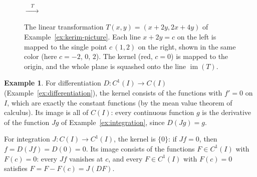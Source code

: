 \documentclass[11pt]{article}
\theoremstyle{definition}
\newtheorem{example}[definition]{Example}
\theoremstyle{plain}
\theoremstyle{remark}
\DeclareMathOperator{\im}{im}
\begin{document}
\begin{figure}[ht]
    \centering
    \quad $\xrightarrow{\quad T \quad}$ \quad
    \caption[Kernel and image of a linear transformation]{The linear transformation $T(x, y) = (x + 2y, 2x + 4y)$ of Example~\ref{ex:kerim-picture}. Each line $x + 2y = c$ on the left is mapped to the single point $c\,(1, 2)$ on the right, shown in the same color (here $c = -2$, $0$, $2$). The kernel (red, $c = 0$) is mapped to the origin, and the whole plane is squashed onto the line $\im(T)$.}
    \label{fig:kernel-image}
\end{figure}

\begin{example}\label{ex:D-kernel}
    For differentiation $D: C^1(I) \to C(I)$ (Example~\ref{ex:differentiation}), the kernel consists of the functions with $f' = 0$ on $I$, which are exactly the constant functions (by the mean value theorem of calculus). Its image is all of $C(I)$: every continuous function $g$ is the derivative of the function $Jg$ of Example~\ref{ex:integration}, since $D(Jg) = g$.

    For integration $J: C(I) \to C^1(I)$, the kernel is $\{0\}$: if $Jf = 0$, then $f = D(Jf) = D(0) = 0$. Its image consists of the functions $F \in C^1(I)$ with $F(c) = 0$: every $Jf$ vanishes at $c$, and every $F \in C^1(I)$ with $F(c) = 0$ satisfies $F = F - F(c) = J(DF)$.
\end{example}
\end{document}
